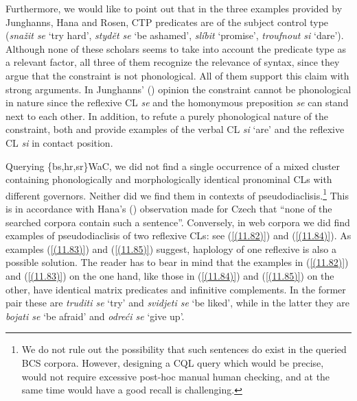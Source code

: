 \noindent Furthermore, we would like to point out that in the three examples provided by Junghanns, Hana and Rosen, CTP predicates are of the subject control type (\textit{snažit se} ‘try hard’, \textit{stydět se} ‘be ashamed’, \textit{slíbit} ‘promise’, \textit{troufnout si} ‘dare’). Although none of these scholars seems to take into account the predicate type as a relevant factor, all three of them recognize the relevance of syntax, since they argue that the constraint is not phonological. All of them support this claim with strong arguments. In Junghanns’ (\citeyear[80]{Junghanns02}) opinion the constraint cannot be phonological in nature since the reflexive CL \textit{se} and the homonymous preposition \textit{se} can stand next to each other. In addition, to refute a purely phonological nature of the constraint, both \citet[124]{Hana07} and \citet[105]{Rosen14} provide examples of the verbal CL \textit{si} ‘are’ and the reflexive CL \textit{si} in contact position.

Querying \{bs,hr,sr\}WaC, we did not find a single occurrence of a mixed cluster containing phonologically and morphologically identical pronominal CLs with different governors. Neither did we find them in contexts of pseudodiaclisis.\footnote{We do not rule out the possibility that such sentences do exist in the queried BCS corpora. However, designing a CQL query which would be precise, would not require excessive post-hoc manual human checking, and at the same time would have a good recall is challenging.} This is in accordance with Hana's (\citeyear[123]{Hana07}) observation made for Czech that “none of the searched corpora contain such a sentence”. Conversely, in web corpora we did find examples of pseudodiaclisis of two reflexive CLs: see (\ref{(11.82)}) and (\ref{(11.84)}). As examples (\ref{(11.83)}) and (\ref{(11.85)}) suggest, haplology of one reflexive is also a possible solution. The reader has to bear in mind that the examples in (\ref{(11.82)}) and (\ref{(11.83)}) on the one hand, like those in (\ref{(11.84)}) and (\ref{(11.85)}) on the other, have identical matrix predicates and infinitive complements. In the former pair these are \textit{truditi se} ‘try’ and \textit{svidjeti se} ‘be liked’, while in the latter they are \textit{bojati se} ‘be afraid’ and \textit{odreći se} ‘give up’. 

